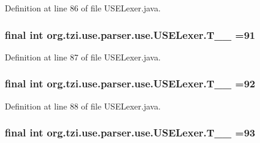 Definition at line 86 of file U\-S\-E\-Lexer.\-java.

\hypertarget{classorg_1_1tzi_1_1use_1_1parser_1_1use_1_1_u_s_e_lexer_a35f067bed32297d2382e356fd34e4d4a}{
\subsubsection[{T\-\_\-\-\_\-91}]{\setlength{\rightskip}{0pt plus 5cm}final int org.\-tzi.\-use.\-parser.\-use.\-U\-S\-E\-Lexer.\-T\-\_\-\-\_ =91\hspace{0.3cm}{\ttfamily [static]}}}\label{classorg_1_1tzi_1_1use_1_1parser_1_1use_1_1_u_s_e_lexer_a35f067bed32297d2382e356fd34e4d4a}


Definition at line 87 of file U\-S\-E\-Lexer.\-java.

\hypertarget{classorg_1_1tzi_1_1use_1_1parser_1_1use_1_1_u_s_e_lexer_abf4befde8d8930e7613f1fe4097d3a53}{
\subsubsection[{T\-\_\-\-\_\-92}]{\setlength{\rightskip}{0pt plus 5cm}final int org.\-tzi.\-use.\-parser.\-use.\-U\-S\-E\-Lexer.\-T\-\_\-\-\_ =92\hspace{0.3cm}{\ttfamily [static]}}}\label{classorg_1_1tzi_1_1use_1_1parser_1_1use_1_1_u_s_e_lexer_abf4befde8d8930e7613f1fe4097d3a53}


Definition at line 88 of file U\-S\-E\-Lexer.\-java.

\hypertarget{classorg_1_1tzi_1_1use_1_1parser_1_1use_1_1_u_s_e_lexer_aea3b16ec4a92c01483ed664f60af2b87}{
\subsubsection[{T\-\_\-\-\_\-93}]{\setlength{\rightskip}{0pt plus 5cm}final int org.\-tzi.\-use.\-parser.\-use.\-U\-S\-E\-Lexer.\-T\-\_\-\-\_ =93\hspace{0.3cm}{\ttfamily [static]}}}\label{classorg_1_1tzi_1_1use_1_1parser_1_1use_1_1_u_s_e_lexer_aea3b16ec4a92c01483ed664f60af2b87}


